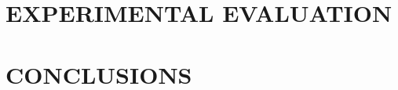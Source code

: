 \documentclass[letterpaper, 10 pt, conference]{ieeeconf}  %
\begin{document}
\section{EXPERIMENTAL EVALUATION}\label{sec:experiments}



\section{CONCLUSIONS}









\end{document}
